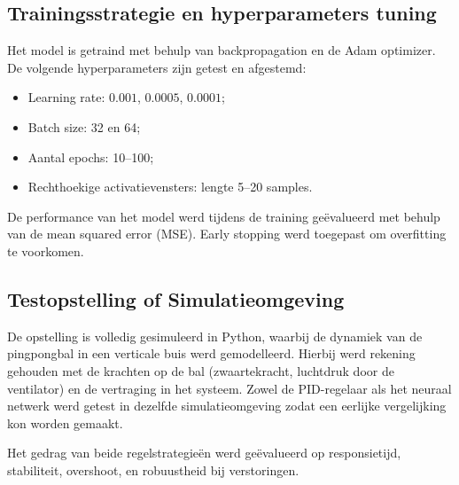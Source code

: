 \subsection{Trainingsstrategie en hyperparameters tuning}
Het model is getraind met behulp van backpropagation en de Adam optimizer. De volgende hyperparameters zijn getest en afgestemd:
\begin{itemize}
    \item Learning rate: $0.001$, $0.0005$, $0.0001$;
    \item Batch size: 32 en 64;
    \item Aantal epochs: 10–100;
    \item Rechthoekige activatievensters: lengte 5–20 samples.
\end{itemize}

De performance van het model werd tijdens de training geëvalueerd met behulp van de mean squared error (MSE). Early stopping werd toegepast om overfitting te voorkomen.

\subsection{Testopstelling of Simulatieomgeving}

De opstelling is volledig gesimuleerd in Python, waarbij de dynamiek van de pingpongbal in een verticale buis werd gemodelleerd. Hierbij werd rekening gehouden met de krachten op de bal (zwaartekracht, luchtdruk door de ventilator) en de vertraging in het systeem. Zowel de PID-regelaar als het neuraal netwerk werd getest in dezelfde simulatieomgeving zodat een eerlijke vergelijking kon worden gemaakt.

Het gedrag van beide regelstrategieën werd geëvalueerd op responsietijd, stabiliteit, overshoot, en robuustheid bij verstoringen.








